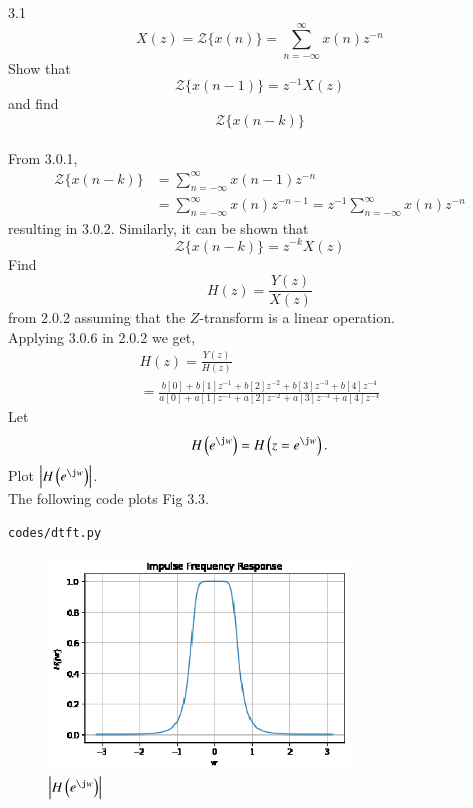 \documentclass[journal,12pt,twocolumn]{IEEEtran}
\begin{document}
\label{prob:Z-transform_formula}
%
3.1
\begin{equation}
\label{eq:z_trans}
X(z)={\mathcal {Z}}\{x(n)\}=\sum _{n=-\infty }^{\infty }x(n)z^{-n}
\end{equation}
%
Show that
\begin{equation}
\label{eq:shift1}
{\mathcal {Z}}\{x(n-1)\} = z^{-1}X(z)
\end{equation}
and find
\begin{equation}
	{\mathcal {Z}}\{x(n-k)\} 
\end{equation}
\\
\solution From 3.0.1,
\begin{align}
{\mathcal {Z}}\{x(n-k)\} &=\sum _{n=-\infty }^{\infty }x(n-1)z^{-n}
\\
&=\sum _{n=-\infty }^{\infty }x(n)z^{-n-1} = z^{-1}\sum _{n=-\infty }^{\infty }x(n)z^{-n}
\end{align}
resulting in 3.0.2. Similarly, it can be shown that
%
\begin{equation}
\label{eq:z_trans_shift}
	{\mathcal {Z}}\{x(n-k)\} = z^{-k}X(z)
\end{equation}
Find
%
\begin{equation}
H(z) = \frac{Y(z)}{X(z)}
\end{equation}
%
from  2.0.2 assuming that the $Z$-transform is a linear operation.
\\
\solution  Applying 3.0.6 in 2.0.2 we get,
\begin{equation}
\begin{split}
H(z) = \frac{Y(z)}{H(z)}                
\\
=\frac{b[0]+b[1]z^{-1}+b[2]z^{-2}+b[3]z^{-3}+b[4]z^{-4}}{a[0]+a[1]z^{-1}+a[2]z^{-2}+a[3]z^{-3}+a[4]z^{-4}}
\label{eq:freq_resp}
\end{split}
\end{equation}
%
Let
\begin{equation}
H\brak{e^{\j w}} = H\brak{z = e^{\j w}}.
\end{equation}
Plot $\abs{H\brak{e^{\j w}}}$.
\\
\solution
The following code plots Fig 3.3.
\begin{lstlisting}
codes/dtft.py
\end{lstlisting}
\begin{figure}[!ht]
\centering
\includegraphics[width=8cm]{./figs/impulse_response.eps}
\caption{$\abs{H\brak{e^{\j w}}}$}
\label{fig:H(jw)}
\end{figure}
\end{document}
